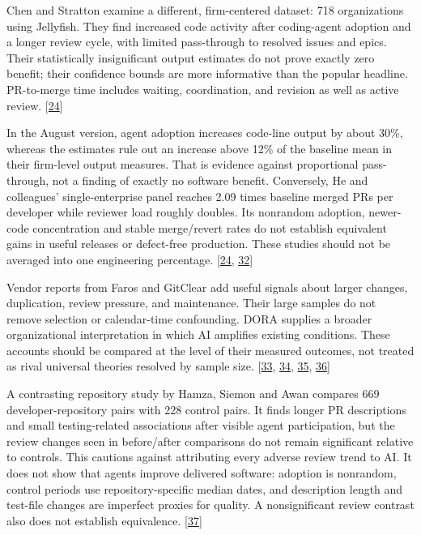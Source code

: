 Chen and Stratton examine a different, firm-centered dataset: 718 organizations using Jellyfish. They find increased code activity after coding-agent adoption and a longer review cycle, with limited pass-through to resolved issues and epics. Their statistically insignificant output estimates do not prove exactly zero benefit; their confidence bounds are more informative than the popular headline. PR-to-merge time includes waiting, coordination, and revision as well as active review. [\hyperlink{ref-chenstratton2026}{24}]


In the August version, agent adoption increases code-line output by about 30\%, whereas the estimates rule out an increase above 12\% of the baseline mean in their firm-level output measures. That is evidence against proportional pass-through, not a finding of exactly no software benefit. Conversely, He and colleagues' single-enterprise panel reaches 2.09 times baseline merged PRs per developer while reviewer load roughly doubles. Its nonrandom adoption, newer-code concentration and stable merge/revert rates do not establish equivalent gains in useful releases or defect-free production. These studies should not be averaged into one engineering percentage. [\hyperlink{ref-chenstratton2026}{24}, \hyperlink{ref-hemandate2026}{32}]


Vendor reports from Faros and GitClear add useful signals about larger changes, duplication, review pressure, and maintenance. Their large samples do not remove selection or calendar-time confounding. DORA supplies a broader organizational interpretation in which AI amplifies existing conditions. These accounts should be compared at the level of their measured outcomes, not treated as rival universal theories resolved by sample size. [\hyperlink{ref-faros2026}{33}, \hyperlink{ref-gitclear2025}{34}, \hyperlink{ref-dora2025}{35}, \hyperlink{ref-doratensions2026}{36}]


A contrasting repository study by Hamza, Siemon and Awan compares 669 developer-repository pairs with 228 control pairs. It finds longer PR descriptions and small testing-related associations after visible agent participation, but the review changes seen in before/after comparisons do not remain significant relative to controls. This cautions against attributing every adverse review trend to AI. It does not show that agents improve delivered software: adoption is nonrandom, control periods use repository-specific median dates, and description length and test-file changes are imperfect proxies for quality. A nonsignificant review contrast also does not establish equivalence. [\hyperlink{ref-hamza2026}{37}]


